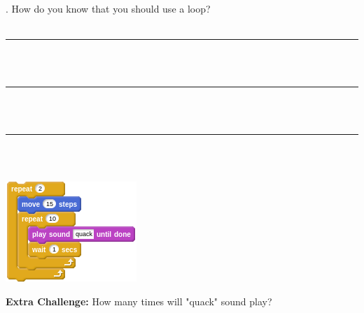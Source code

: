 \documentclass[letterpaper,12pt]{article}
\newcommand\numbox{%
    \fbox{\rule{1in}{0pt}\rule[-1ex]{0pt}{5ex}}}
\begin{document}
\noindent \dotfill \\

. How do you know that you should use a loop? \\ \\
\noindent \rule{18.5cm}{0.5pt} \\ \\
\noindent \rule{18.5cm}{0.5pt} \\ \\
\noindent \rule{18.5cm}{0.5pt} \\

\noindent \dotfill \\
\begin{center}
\includegraphics[scale=.7]{ec_script0.png}
\end{center}

\noindent \textbf{Extra Challenge:} How many times will "quack" sound play? \numbox
\end{document}
